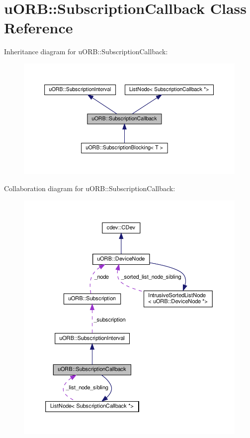 \hypertarget{classuORB_1_1SubscriptionCallback}{}\section{u\+O\+RB\+:\+:Subscription\+Callback Class Reference}
\label{classuORB_1_1SubscriptionCallback}


Inheritance diagram for u\+O\+RB\+:\+:Subscription\+Callback\+:\nopagebreak
\begin{figure}[H]
\begin{center}
\leavevmode
\includegraphics[width=350pt]{d6/d4a/classuORB_1_1SubscriptionCallback__inherit__graph}
\end{center}
\end{figure}


Collaboration diagram for u\+O\+RB\+:\+:Subscription\+Callback\+:\nopagebreak
\begin{figure}[H]
\begin{center}
\leavevmode
\includegraphics[width=350pt]{d1/dba/classuORB_1_1SubscriptionCallback__coll__graph}
\end{center}
\end{figure}
